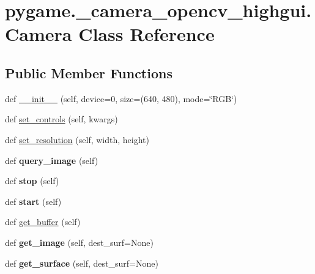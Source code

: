 \hypertarget{classpygame_1_1__camera__opencv__highgui_1_1_camera}{}\section{pygame.\+\_\+camera\+\_\+opencv\+\_\+highgui.\+Camera Class Reference}
\label{classpygame_1_1__camera__opencv__highgui_1_1_camera}
\subsection*{Public Member Functions}
\begin{DoxyCompactItemize}
\item 
def \hyperlink{classpygame_1_1__camera__opencv__highgui_1_1_camera_af602779a49847391997f2689b79395ff}{\+\_\+\+\_\+init\+\_\+\+\_\+} (self, device=0, size=(640, 480), mode=\char`\"{}R\+GB\char`\"{})
\item 
def \hyperlink{classpygame_1_1__camera__opencv__highgui_1_1_camera_a011d26f0cf2f9411bd159064e742dc6b}{set\+\_\+controls} (self, kwargs)
\item 
def \hyperlink{classpygame_1_1__camera__opencv__highgui_1_1_camera_ad950ec8a28b969fb3902181a348cf198}{set\+\_\+resolution} (self, width, height)
\item 
\mbox{\label{classpygame_1_1__camera__opencv__highgui_1_1_camera_acce9d8fa792ebf2145e1e5b16ef9cdb6}} 
def {\bfseries query\+\_\+image} (self)
\item 
\mbox{\label{classpygame_1_1__camera__opencv__highgui_1_1_camera_a256b1ca7832ab60f62c70390d8b226b3}} 
def {\bfseries stop} (self)
\item 
\mbox{\label{classpygame_1_1__camera__opencv__highgui_1_1_camera_aea1098a5b4bd2a61f809d64ed563d29b}} 
def {\bfseries start} (self)
\item 
def \hyperlink{classpygame_1_1__camera__opencv__highgui_1_1_camera_acebcdf30bcc3e658ce89180260dcb1ba}{get\+\_\+buffer} (self)
\item 
\mbox{\label{classpygame_1_1__camera__opencv__highgui_1_1_camera_abd48f970407996125f9c7718bf41416b}} 
def {\bfseries get\+\_\+image} (self, dest\+\_\+surf=None)
\item 
\mbox{\label{classpygame_1_1__camera__opencv__highgui_1_1_camera_ad0b4d3631fd445714ae69fd439bb95c5}} 
def {\bfseries get\+\_\+surface} (self, dest\+\_\+surf=None)
\end{DoxyCompactItemize}
